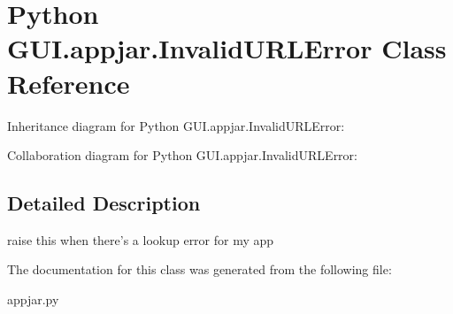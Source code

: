 \hypertarget{class_python_01_g_u_i_1_1appjar_1_1_invalid_u_r_l_error}{}\section{Python G\+U\+I.\+appjar.\+Invalid\+U\+R\+L\+Error Class Reference}
\label{class_python_01_g_u_i_1_1appjar_1_1_invalid_u_r_l_error}


Inheritance diagram for Python G\+U\+I.\+appjar.\+Invalid\+U\+R\+L\+Error\+:


Collaboration diagram for Python G\+U\+I.\+appjar.\+Invalid\+U\+R\+L\+Error\+:


\subsection{Detailed Description}
\begin{DoxyVerb}raise this when there's a lookup error for my app\end{DoxyVerb}
 

The documentation for this class was generated from the following file\+:\begin{DoxyCompactItemize}
\item 
appjar.\+py\end{DoxyCompactItemize}
